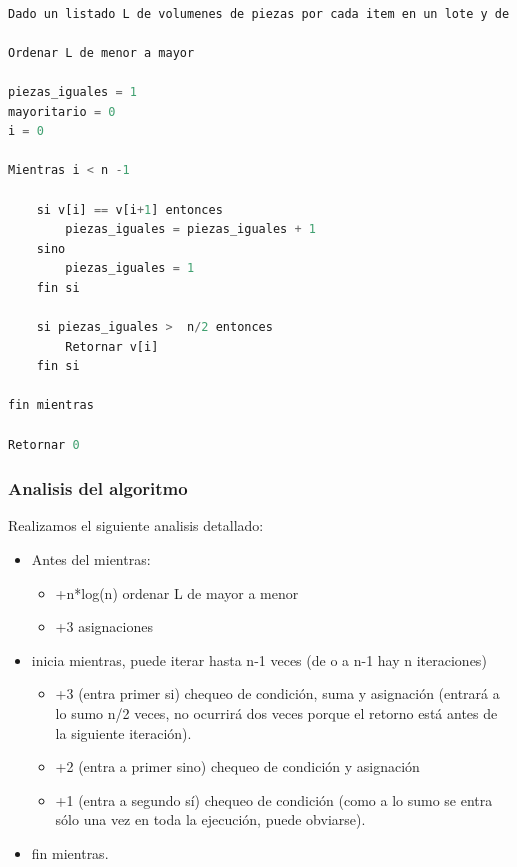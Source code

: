 \documentclass{article}
\begin{document}
\begin{lstlisting}[language=Python, caption=Algoritmo del proceso B]

Dado un listado L de volumenes de piezas por cada item en un lote y de n elementos.

Ordenar L de menor a mayor

piezas_iguales = 1
mayoritario = 0
i = 0

Mientras i < n -1 
    
    si v[i] == v[i+1] entonces 
        piezas_iguales = piezas_iguales + 1
    sino
        piezas_iguales = 1
    fin si

    si piezas_iguales >  n/2 entonces
        Retornar v[i]
    fin si

fin mientras

Retornar 0


\end{lstlisting}

\subsubsection{Analisis del algoritmo}

Realizamos el siguiente analisis detallado:

\begin{itemize}
    \item Antes del mientras:
    \begin{itemize}
        \item +n*log(n) ordenar L de mayor a menor
        \item +3 asignaciones
    \end{itemize}
    \item inicia mientras, puede iterar hasta n-1 veces (de o a n-1 hay n iteraciones)
    \begin{itemize}
        \item +3 (entra primer si) chequeo de condición, suma y asignación (entrará a lo sumo n/2 veces, no ocurrirá dos veces porque el retorno está antes de la siguiente iteración).
        \item +2 (entra a primer sino) chequeo de condición y asignación
        \item +1 (entra a segundo sí) chequeo de condición (como a lo sumo se entra sólo una vez en toda la ejecución, puede obviarse).
    \end{itemize}
    \item fin mientras.
\end{itemize}
\end{document}
